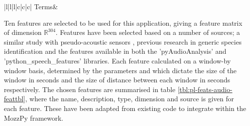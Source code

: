 \begin{table}[ht]
\begin{tabular}{|l|l|l|c|c|c|}
                    \hline
                    \hline
                        Terms&\cr
                    \hline
                \end{tabular}
            \caption{Summary of features implemented in MozzPy.}
            \label{tbl:pl-feats-audio-feattbl}
        \end{table}
        Ten features are selected to be used for this application, giving a feature matrix of dimension $\mathbb{R}^{304}$. Features have been selected based on a number of sources; a similar study with pseudo-acoustic sensors \cite{Silva2013}, previous research in generic species identification \cite{Zilli2016} and the features available in both the 'pyAudioAnalysis' \cite{Giannakopoulos2015} and 'python\_speech\_features' \cite{Lyons} libraries. Each feature calculated on a window-by window basis, determined by the parameters  and  which dictate the size of the window in seconds and the size of distance between each window in seconds respectively. 
        The chosen features are summarised in table \ref{tbl:pl-feats-audio-feattbl}, where the name, description, type, dimension and source is given for each feature. These have been adapted from existing code to integrate within the MozzPy framework.
        
